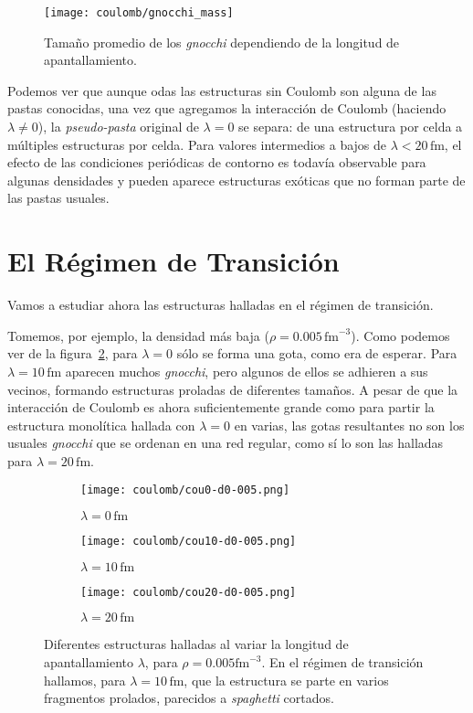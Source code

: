 \begin{figure}[h] %
\centering
\texttt{[image: coulomb/gnocchi\_mass]}
\caption{Tamaño promedio de los \emph{gnocchi} dependiendo de la longitud de apantallamiento.}
\label{fig:gnocchi_mass}
\end{figure}

Podemos ver que aunque odas las estructuras sin Coulomb son alguna de las pastas conocidas, una vez que agregamos la interacción de Coulomb (haciendo $\lambda\neq0$), la \emph{pseudo-pasta} original de $\lambda=0$ se separa: de una estructura por celda a múltiples estructuras por celda.
Para valores intermedios a bajos de $\lambda < 20\,\text{fm}$, el efecto de las condiciones periódicas de contorno es todavía observable para algunas densidades y pueden aparece estructuras exóticas que no forman parte de las pastas usuales.

\section{El Régimen de Transición} \label{transition}

Vamos a estudiar ahora las estructuras halladas en el régimen de transición.

Tomemos, por ejemplo, la densidad más baja ($\rho=0.005\,\text{fm}^{-3}$).
Como podemos ver de la figura~\ref{fig:gnocchi}, para $\lambda=0$ sólo se forma una gota, como era de esperar.
Para $\lambda=10\,\text{fm}$ aparecen muchos \emph{gnocchi}, pero algunos de ellos se adhieren a sus vecinos, formando estructuras proladas de diferentes tamaños.
A pesar de que la interacción de Coulomb es ahora suficientemente grande como para partir la estructura monolítica hallada con $\lambda=0$ en varias, las gotas resultantes no son los usuales \emph{gnocchi} que se ordenan en una red regular, como sí lo son las halladas para $\lambda=20\,\text{fm}$.

\begin{figure}[h!]  \centering
  \begin{subfigure}[h!]{0.3\columnwidth}
    \centering
    \texttt{[image: coulomb/cou0-d0-005.png]}
    \caption{$\lambda=0\,\text{fm}$}
  \end{subfigure}
  \begin{subfigure}[h!]{0.3\columnwidth}
    \centering
    \texttt{[image: coulomb/cou10-d0-005.png]}
    \caption{$\lambda=10\,\text{fm}$}
  \end{subfigure}
  \begin{subfigure}[h!]{0.3\columnwidth}
    \centering
    \texttt{[image: coulomb/cou20-d0-005.png]}
    \caption{$\lambda=20\,\text{fm}$}
  \end{subfigure}
  \caption{Diferentes estructuras halladas al variar la longitud de apantallamiento $\lambda$, para $\rho=0.005\text{fm}^{-3}$.
    En el régimen de transición hallamos, para $\lambda=10\,\text{fm}$, que la estructura se parte en varios fragmentos prolados, parecidos a \emph{spaghetti} cortados.}
  \label{fig:gnocchi}
\end{figure}


